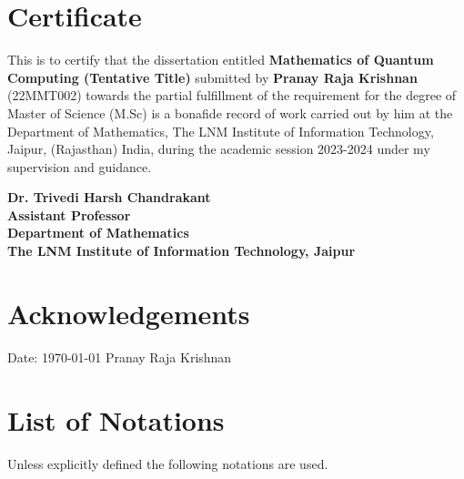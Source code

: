 \documentclass[12pt,twoside,fleqn]{report}
\theoremstyle{thmstyle}
\begin{document}
\renewcommand{\sectionmark}[1]{\markright{#1}}

\chapter*{Certificate}

This is to certify that the dissertation entitled \textbf{Mathematics of Quantum Computing (Tentative Title)} submitted by \textbf{Pranay Raja Krishnan} (22MMT002) towards the partial fulfillment of the requirement for the degree of Master of Science (M.Sc) is a bonafide record of work carried out by him at the Department of Mathematics, The LNM Institute of Information Technology, Jaipur, (Rajasthan) India, during the academic session 2023-2024 under my supervision and guidance. \\
\vspace*{3cm}
\begin{flushright}
	\hfill
	{\parbox{7cm}{\textbf{Dr. Trivedi Harsh Chandrakant\\
	Assistant Professor\\
	Department of Mathematics\\
	The LNM Institute of Information Technology, Jaipur}}}
\end{flushright}

\chapter*{Acknowledgements}

\lipsum[2]


\vspace*{3cm}
Date: \today
\hfill{}
Pranay Raja Krishnan

\chapter*{List of Notations}
Unless explicitly defined the following notations are used.\\
\end{document}
